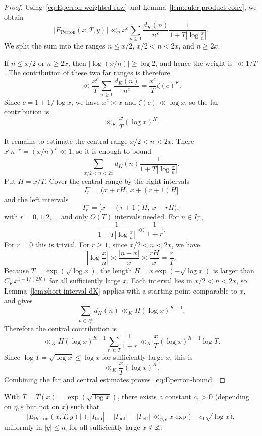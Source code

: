 \begin{proof}
Using~\eqref{eq:Eperron-weighted-raw} and Lemma~\ref{lem:euler-product-conv}, we obtain
\[
    |E_{\mathrm{Perron}}(x,T,y)|
    \ll_\eta
    x^c\sum_{n\geq1}
    \frac{d_K(n)}{n^c}
    \frac{1}{1+T\left|\log\frac{x}{n}\right|}.
\]
We split the sum into the ranges $n\leq x/2$, $x/2<n<2x$, and
$n\geq2x$.

If $n\leq x/2$ or $n\geq2x$, then
$|\log(x/n)|\geq\log2$, and hence the weight is $\ll 1/T$.
The contribution of these two far ranges is therefore
\[
    \ll
    \frac{x^c}{T}\sum_{n\geq1}\frac{d_K(n)}{n^c}
    =
    \frac{x^c}{T}\zeta(c)^K.
\]
Since $c=1+1/\log x$, we have $x^c\asymp x$ and
$\zeta(c)\ll\log x$, so the far contribution is
\[
    \ll_K \frac{x}{T}(\log x)^K.
\]

It remains to estimate the central range $x/2<n<2x$. There
$x^c n^{-c}=(x/n)^c\ll1$, so it is enough to bound
\[
    \sum_{x/2<n<2x}
    d_K(n)\frac{1}{1+T\left|\log\frac{x}{n}\right|}.
\]
Put $H=x/T$. Cover the central range by the right intervals
\[
    I_r^+=(x+rH,\ x+(r+1)H]
\]
and the left intervals
\[
    I_r^-=[x-(r+1)H,\ x-rH),
\]
with $r=0,1,2,\ldots$ and only $O(T)$ intervals needed. For
$n\in I_r^\pm$,
\[
    \frac{1}{1+T\left|\log\frac{x}{n}\right|}
    \ll \frac{1}{1+r}.
\]
For $r=0$ this is trivial. For $r\geq1$, since $x/2<n<2x$,
we have
\[
    \left|\log\frac{x}{n}\right|
    \asymp \frac{|n-x|}{x}
    \asymp \frac{rH}{x}
    =\frac{r}{T}.
\]
Because $T=\exp(\sqrt{\log x})$, the length
$H=x\exp(-\sqrt{\log x})$ is larger than
$C_K x^{1-1/(2K)}$ for all sufficiently large $x$. Each interval
lies in $x/2<n<2x$, so Lemma~\ref{lem:short-interval-dK} applies
with a starting point comparable to $x$, and gives
\[
    \sum_{n\in I_r^\pm}d_K(n)
    \ll_K H(\log x)^{K-1}.
\]
Therefore the central contribution is
\[
    \ll_K
    H(\log x)^{K-1}
    \sum_{r\ll T}\frac1{1+r}
    \ll_K
    \frac{x}{T}(\log x)^{K-1}\log T.
\]
Since $\log T=\sqrt{\log x}\leq\log x$ for sufficiently large
$x$, this is
\[
    \ll_K \frac{x}{T}(\log x)^K.
\]
Combining the far and central estimates proves~\eqref{eq:Eperron-bound}.
\end{proof}

\begin{proposition}\label{prop:nonlocal-error}
With $T = T(x) = \exp(\sqrt{\log x})$, there exists a constant
$c_1 > 0$ (depending on $\eta, \varepsilon$ but not on $x$) such
that
\begin{equation}\label{eq:total-nonlocal-error}
    |E_{\mathrm{Perron}}(x, T, y)|
    + |I_{\mathrm{top}}| + |I_{\mathrm{bot}}|
    + |I_{\mathrm{left}}|
    \ll_{\eta, \varepsilon}
    x \exp\bigl(- c_1 \sqrt{\log x}\bigr),
\end{equation}
uniformly in $|y| \leq \eta$, for all sufficiently large
$x\notin\mathbb Z$.
\end{proposition}

